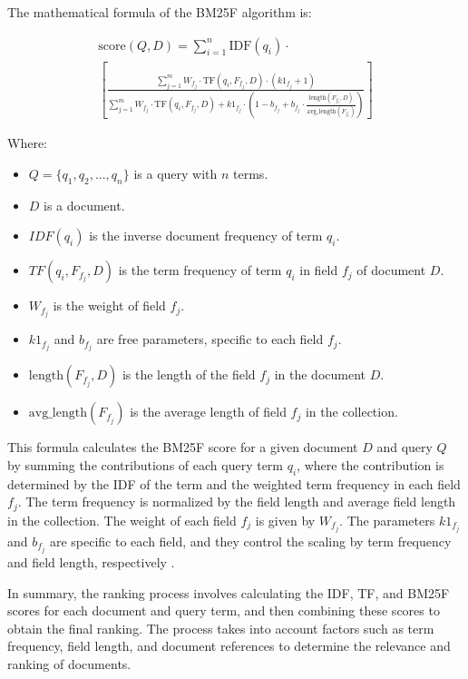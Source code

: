 \documentclass{article}
\begin{document}
The mathematical formula of the BM25F algorithm is:

\begin{multline}
    \text{{score}}(Q, D) = \sum_{i=1}^{n} \text{{IDF}}(q_i) \cdot \\
    \left[ \frac{\sum_{j=1}^{m} W_{f_j} \cdot \text{{TF}}(q_i, F_{f_j}, D) \cdot (k1_{f_j} + 1)}{\sum_{j=1}^{m} W_{f_j} \cdot \text{{TF}}(q_i, F_{f_j}, D) + k1_{f_j} \cdot \left(1 - b_{f_j} + b_{f_j} \cdot \frac{\text{{length}}(F_{f_j}, D)}{\text{{avg\_length}}(F_{f_j})}\right)} \right]
\end{multline}

Where:
\begin{itemize}
  \item $Q = \{q_1, q_2, ..., q_n\}$ is a query with $n$ terms.
  \item $D$ is a document.
  \item $IDF(q_i)$ is the inverse document frequency of term $q_i$.
  \item $TF(q_i, F_{f_j}, D)$ is the term frequency of term $q_i$ in field $f_j$ of document $D$.
  \item $W_{f_j}$ is the weight of field $f_j$.
  \item $k1_{f_j}$ and $b_{f_j}$ are free parameters, specific to each field $f_j$.
  \item $\text{{length}}(F_{f_j}, D)$ is the length of the field $f_j$ in the document $D$.
  \item $\text{{avg\_length}}(F_{f_j})$ is the average length of field $f_j$ in the collection.
\end{itemize}

This formula calculates the BM25F score for a given document $D$ and query $Q$ by summing 
the contributions of each query term $q_i$, where the contribution is determined by the IDF of 
the term and the weighted term frequency in each field $f_j$. The term frequency is normalized
by the field length and average field length in the collection. The weight of each field $f_j$ is
given by $W_{f_j}$. The parameters $k1_{f_j}$ and $b_{f_j}$ are specific to each field, and they control the 
scaling by term frequency and field length, respectively \cite{Rost2022}. 

In summary, the ranking process involves calculating the IDF, TF, and BM25F \cite{PJAGIF10} 
scores for each 
document and query term, and then combining these scores to obtain the final ranking. The 
process takes into account factors such as term frequency, field length, and document references 
to determine the relevance and ranking of documents.
\end{document}
